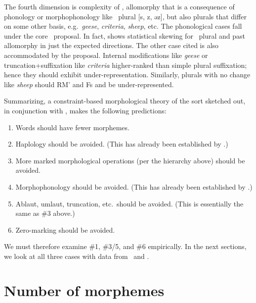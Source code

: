\documentclass[output=paper,
modfonts
]{LSP/langsci}
\begin{document}
The fourth dimension is complexity of , allomorphy that is a consequence of phonology or morphophonology like \e\ plural [s, z, əz], but also plurals that differ on some other basis, e.g.\ \emph{geese}, \emph{criteria}, \emph{sheep}, etc. The phonological cases fall under the core \io\ proposal. In fact, \citet{inopt} shows statistical skewing for \e\ plural and past allomorphy in just the expected directions. The other case cited is also accommodated by the proposal. Internal modifications like \emph{geese} or truncation+suffixation like \emph{criteria}   higher-ranked  than simple plural suffixation; hence they should exhibit under-representation. Similarly, plurals with no change like \emph{sheep} should   RM' and Fs and be under-represented.

Summarizing, a constraint-based morphological theory of the sort sketched out, in conjunction with \io, makes the following predictions:

\begin{enumerate}

\item Words should have fewer morphemes.

\item Haplology should be avoided. (This has already been established by \citealt{inopt.phon}.)

\item More marked morphological operations (per the hierarchy above) should be avoided.

\item Morphophonology should be avoided. (This has already been established by \citealt{inopt}.)

\item Ablaut, umlaut, truncation, etc.\ should be avoided. (This is essentially the same as \#3 above.)

\item Zero-marking should be avoided.

\end{enumerate}

We must therefore examine \#1, \#3/5, and \#6 empirically. In the next sections, we look at all three cases with data from \e\ and \w.

\section{Number of morphemes}
\end{document}
